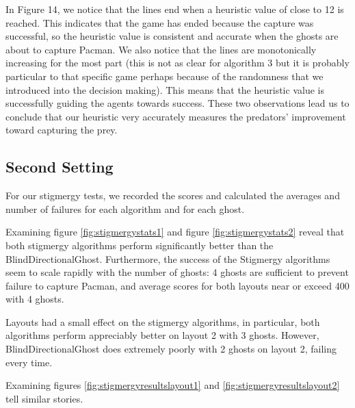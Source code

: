\documentclass[11pt]{article}
\begin{document}
\begin{multicols}{2}
\noindent In Figure 14, we notice that the lines end when a heuristic value of close to 12 is reached. This indicates that the game has ended because the capture was successful, so the heuristic value is consistent and accurate when the ghosts are about to capture Pacman. We also notice that the lines are monotonically increasing for the most part (this is not as clear for algorithm 3 but it is probably particular to that specific game perhaps because of the randomness that we introduced into the decision making). This means that the heuristic value is successfully guiding the agents towards success. These two observations lead us to conclude that our heuristic very accurately measures the predators' improvement toward capturing the prey. 

\subsection{Second Setting}

For our stigmergy tests, we recorded the scores and calculated the averages and number of failures for each algorithm and for each ghost. 

Examining figure \ref{fig:stigmergystats1} and figure \ref{fig:stigmergystats2} reveal that both stigmergy algorithms perform significantly better than the BlindDirectionalGhost.  Furthermore, the success of the Stigmergy algorithms seem to scale rapidly with the number of ghosts: 4 ghosts are sufficient to prevent failure to capture Pacman, and average scores for both layouts near or exceed 400 with 4 ghosts. 

Layouts had a small effect on the stigmergy algorithms, in particular, both algorithms perform appreciably better on layout 2 with 3 ghosts.  However, BlindDirectionalGhost does extremely poorly with 2 ghosts on layout 2, failing every time. 

Examining figures \ref{fig:stigmergyresultslayout1} and \ref{fig:stigmergyresultslayout2} tell similar stories.  

\end{multicols}
\end{document}
